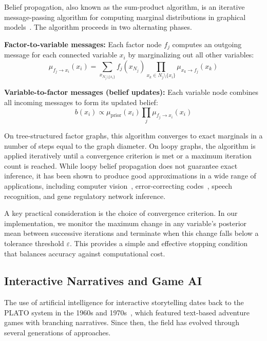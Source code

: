 \documentclass[journal]{IEEEtran}
\begin{document}
Belief propagation, also known as the sum-product algorithm, is an iterative message-passing algorithm for computing marginal distributions in graphical models~\cite{ref2,ref3}. The algorithm proceeds in two alternating phases.

\textbf{Factor-to-variable messages:} Each factor node $f_j$ computes an outgoing message for each connected variable $x_i$ by marginalizing out all other variables:
\begin{equation}
\mu_{f_j \to x_i}(x_i) = \sum_{x_{N_j \setminus \{x_i\}}} f_j(x_{N_j}) \prod_{x_k \in N_j \setminus \{x_i\}} \mu_{x_k \to f_j}(x_k)
\end{equation}

\textbf{Variable-to-factor messages (belief updates):} Each variable node combines all incoming messages to form its updated belief:
\begin{equation}
b(x_i) \propto \mu_{\text{prior}}(x_i) \prod_j \mu_{f_j \to x_i}(x_i)
\end{equation}

On tree-structured factor graphs, this algorithm converges to exact marginals in a number of steps equal to the graph diameter. On loopy graphs, the algorithm is applied iteratively until a convergence criterion is met or a maximum iteration count is reached. While loopy belief propagation does not guarantee exact inference, it has been shown to produce good approximations in a wide range of applications, including computer vision~\cite{ref4}, error-correcting codes~\cite{ref5}, speech recognition, and gene regulatory network inference.

A key practical consideration is the choice of convergence criterion. In our implementation, we monitor the maximum change in any variable's posterior mean between successive iterations and terminate when this change falls below a tolerance threshold $\varepsilon$. This provides a simple and effective stopping condition that balances accuracy against computational cost.

\subsection{Interactive Narratives and Game AI}

The use of artificial intelligence for interactive storytelling dates back to the PLATO system in the 1960s and 1970s~\cite{ref6}, which featured text-based adventure games with branching narratives. Since then, the field has evolved through several generations of approaches.
\end{document}
